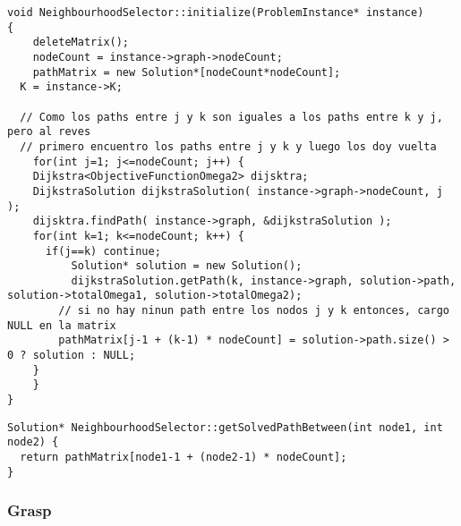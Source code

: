 \begin{lstlisting}[caption=NeighbourhoodSelector::initialize()]
void NeighbourhoodSelector::initialize(ProblemInstance* instance)
{	
	deleteMatrix();
	nodeCount = instance->graph->nodeCount;
	pathMatrix = new Solution*[nodeCount*nodeCount];     
  K = instance->K;   

  // Como los paths entre j y k son iguales a los paths entre k y j, pero al reves
  // primero encuentro los paths entre j y k y luego los doy vuelta
	for(int j=1; j<=nodeCount; j++) {
  	Dijkstra<ObjectiveFunctionOmega2> dijsktra;          
    DijkstraSolution dijkstraSolution( instance->graph->nodeCount, j );                
    dijsktra.findPath( instance->graph, &dijkstraSolution );                      
    for(int k=1; k<=nodeCount; k++) {                    
      if(j==k) continue;
    	  Solution* solution = new Solution();        
    	  dijkstraSolution.getPath(k, instance->graph, solution->path, solution->totalOmega1, solution->totalOmega2);          
        // si no hay ninun path entre los nodos j y k entonces, cargo NULL en la matrix             
        pathMatrix[j-1 + (k-1) * nodeCount] = solution->path.size() > 0 ? solution : NULL;                                  
    }
	}
}
\end{lstlisting}
\begin{lstlisting}[caption=NeighbourhoodSelector::getSolvedPathBetween()]
Solution* NeighbourhoodSelector::getSolvedPathBetween(int node1, int node2) {  
  return pathMatrix[node1-1 + (node2-1) * nodeCount];
}
\end{lstlisting}
\subsubsection{Grasp}


